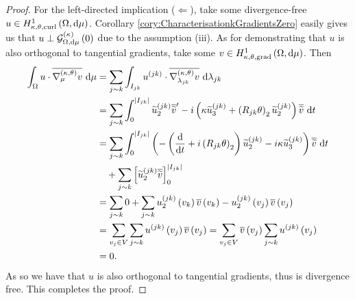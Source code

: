 \begin{proof}
	For the left-directed implication ($\Leftarrow$), take some divergence-free $u\in H^1_{\kappa,\theta,\mathrm{curl}}\left( \Omega, \mathrm{d}\mu \right)$.
	Corollary \ref{cory:CharacterisationkGradientsZero} easily gives us that $u\perp\mathcal{G}_{ \Omega, \mathrm{d}\mu}^{(\kappa)}\left( 0 \right)$ due to the assumption (iii).
	As for demonstrating that $u$ is also orthogonal to tangential gradients, take some $v\in H^1_{\kappa,\theta,\mathrm{grad}}\left( \Omega, \mathrm{d}\mu \right)$.
	Then 
	\begin{align*}
		\int_{\Omega}u\cdot\overline{\nabla^{\left( \kappa, \theta \right)}_{\mu}v} \ \mathrm{d}\mu
		&= \sum_{j\sim k}\int_{I_{jk}}u^{(jk)}\cdot\overline{\nabla^{\left( \kappa, \theta \right)}_{\lambda_{jk}}v} \ \mathrm{d}\lambda_{jk} \\
		&= \sum_{j\sim k}\int_0^{\left\lvert I_{jk} \right\rvert} \widetilde{u}_2^{(jk)}\overline{\widetilde{v}}' - i\left( \kappa\widetilde{u}_3^{(jk)} + \left( R_{jk}\theta \right)_2\widetilde{u}_2^{(jk)} \right)\overline{\widetilde{v}} \ \mathrm{d} t \\
		&= \sum_{j\sim k}\int_0^{\left\lvert I_{jk} \right\rvert} \left( -\left( \dfrac{\mathrm{d}}{\mathrm{d}t} + i\left( R_{jk}\theta \right)_2 \right)\widetilde{u}^{(jk)}_2 - i\kappa\widetilde{u}^{(jk)}_3 \right)\overline{\widetilde{v}} \ \mathrm{d} t \\
		& \quad + \sum_{j\sim k}\left[ \widetilde{u}_2^{(jk)}\overline{\widetilde{v}} \right]_0^{\left\lvert I_{jk} \right\rvert} \\
		&= \sum_{j\sim k}0 + \sum_{j\sim k} u_2^{(jk)}\left( v_k \right)\overline{v}\left( v_k \right) - u_2^{(jk)}\left( v_j \right)\overline{v}\left( v_j \right) \\
		&= \sum_{v_j\in V}\sum_{j\sim k} u^{(jk)}\left( v_j \right)\overline{v}\left( v_j \right)
		= \sum_{v_j\in V}\overline{v}\left( v_j \right)\sum_{j\sim k} u^{(jk)}\left( v_j \right) \\
		& = 0.
	\end{align*}
	As so we have that $u$ is also orthogonal to tangential gradients, thus is divergence free.
	This completes the proof.
\end{proof}

